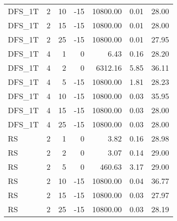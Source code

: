 \begin{center}
\begin{longtable}{lrrrrrr}
  DFS\_1T     & 2 & 10 & -15 & 10800.00 & 0.01 & 28.00 \\ 
  DFS\_1T     & 2 & 15 & -15 & 10800.00 & 0.01 & 28.00 \\ 
  DFS\_1T     & 2 & 25 & -15 & 10800.00 & 0.01 & 27.95 \\ 
  DFS\_1T     & 4 & 1 &   0 & 6.43 & 0.16 & 28.20 \\ 
  DFS\_1T     & 4 & 2 &   0 & 6312.16 & 5.85 & 36.11 \\ 
  DFS\_1T     & 4 & 5 & -15 & 10800.00 & 1.81 & 28.23 \\ 
  DFS\_1T     & 4 & 10 & -15 & 10800.00 & 0.03 & 35.95 \\ 
  DFS\_1T     & 4 & 15 & -15 & 10800.00 & 0.03 & 28.00 \\ 
  DFS\_1T     & 4 & 25 & -15 & 10800.00 & 0.03 & 28.00 \\ 
  RS     & 2 & 1 &   0 & 3.82 & 0.16 & 28.98 \\ 
  RS     & 2 & 2 &   0 & 3.07 & 0.14 & 29.00 \\ 
  RS     & 2 & 5 &   0 & 460.63 & 3.17 & 29.00 \\ 
  RS     & 2 & 10 & -15 & 10800.00 & 0.04 & 36.77 \\ 
  RS     & 2 & 15 & -15 & 10800.00 & 0.03 & 27.97 \\ 
  RS     & 2 & 25 & -15 & 10800.00 & 0.03 & 28.19 \\ 

\end{longtable}
\end{center}
